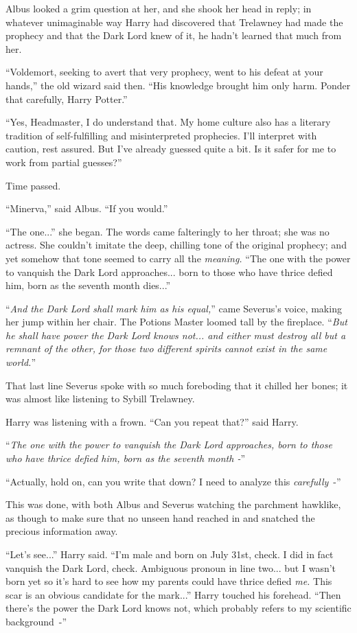 Albus looked a grim question at her, and she shook her head in reply; in whatever unimaginable way Harry had discovered that Trelawney had made the prophecy and that the Dark Lord knew of it, he hadn't learned that much from her.

``Voldemort, seeking to avert that very prophecy, went to his defeat at your hands,'' the old wizard said then. ``His knowledge brought him only harm. Ponder that carefully, Harry Potter.''

``Yes, Headmaster, I do understand that. My home culture also has a literary tradition of self-fulfilling and misinterpreted prophecies. I'll interpret with caution, rest assured. But I've already guessed quite a bit. Is it safer for me to work from partial guesses?''

Time passed.

``Minerva,'' said Albus. ``If you would.''

``The one...'' she began. The words came falteringly to her throat; she was no actress. She couldn't imitate the deep, chilling tone of the original prophecy; and yet somehow that tone seemed to carry all the \emph{meaning.} ``The one with the power to vanquish the Dark Lord approaches... born to those who have thrice defied him, born as the seventh month dies...''

``\emph{And the Dark Lord shall mark him as his equal,}'' came Severus's voice, making her jump within her chair. The Potions Master loomed tall by the fireplace. ``\emph{But he shall have power the Dark Lord knows not... and either must destroy all but a remnant of the other, for those two different spirits cannot exist in the same world.}''

That last line Severus spoke with so much foreboding that it chilled her bones; it was almost like listening to Sybill Trelawney.

Harry was listening with a frown. ``Can you repeat that?'' said Harry.

``\emph{The one with the power to vanquish the Dark Lord approaches, born to those who have thrice defied him, born as the seventh month -}''

``Actually, hold on, can you write that down? I need to analyze this \emph{carefully}~-''

This was done, with both Albus and Severus watching the parchment hawklike, as though to make sure that no unseen hand reached in and snatched the precious information away.

``Let's see...'' Harry said. ``I'm male and born on July 31st, check. I did in fact vanquish the Dark Lord, check. Ambiguous pronoun in line two... but I wasn't born yet so it's hard to see how my parents could have thrice defied \emph{me.} This scar is an obvious candidate for the mark...'' Harry touched his forehead. ``Then there's the power the Dark Lord knows not, which probably refers to my scientific background~-''

